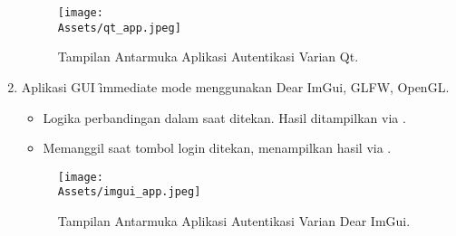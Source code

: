 \begin{enumerate}
\begin{itemize}
	      \end{itemize}
        \begin{figure}[H]
	          \centering
	          \texttt{[image: \\Assets/qt\_app.jpeg]} %
	          \caption{Tampilan Antarmuka Aplikasi Autentikasi Varian Qt.}
	          \label{fig:qt_app_ui}
	      \end{figure}
	\item {} Aplikasi GUI \f{immediate mode} menggunakan Dear ImGui, GLFW, OpenGL.
	      \begin{itemize}
		      \item {} Logika perbandingan dalam  saat  ditekan. Hasil ditampilkan via .
		      \item {} Memanggil  saat tombol login ditekan, menampilkan hasil via .
	      \end{itemize}
        \begin{figure}[H]
	          \centering
	          \texttt{[image: \\Assets/imgui\_app.jpeg]} %
	          \caption{Tampilan Antarmuka Aplikasi Autentikasi Varian Dear ImGui.}
	          \label{fig:imgui_app_ui}
	      \end{figure}
\end{enumerate}

